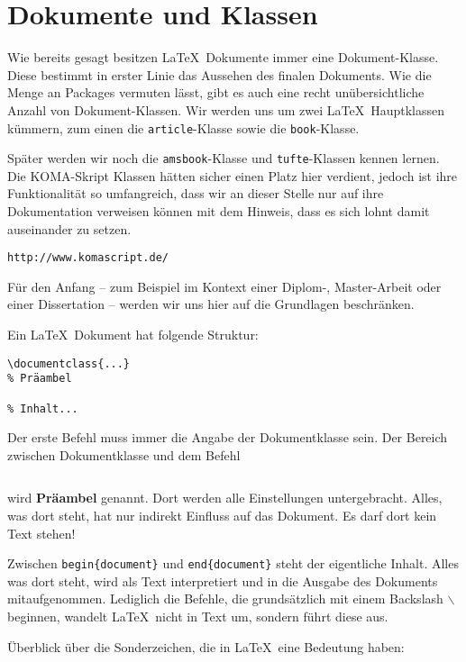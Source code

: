 
\chapter{Dokumente und Klassen}\label{chap:doc}

Wie bereits gesagt besitzen \LaTeX\ Dokumente immer eine Dokument-Klasse. Diese bestimmt in erster Linie das Aussehen des finalen Dokuments. Wie die Menge an Packages vermuten lässt, gibt es auch eine recht unübersichtliche Anzahl von Dokument-Klassen. Wir werden uns um zwei \LaTeX\ Hauptklassen kümmern, zum einen die \texttt{article}-Klasse sowie die \texttt{book}-Klasse.

Später werden wir noch die \texttt{amsbook}-Klasse und \texttt{tufte}-Klassen kennen lernen. Die KOMA-Skript Klassen hätten sicher einen Platz hier verdient, jedoch ist ihre Funktionalität so umfangreich, dass wir an dieser Stelle nur auf ihre Dokumentation verweisen können mit dem Hinweis, dass es sich lohnt damit auseinander zu setzen.
\begin{verbatim}
http://www.komascript.de/
\end{verbatim}
Für den Anfang -- zum Beispiel im Kontext einer Diplom-, Master-Arbeit oder einer Dissertation -- werden wir uns hier auf die Grundlagen beschränken.

Ein \LaTeX\ Dokument hat folgende Struktur: 
\begin{verbatim}
\documentclass{...}
% Präambel

% Inhalt...

\end{verbatim}
Der erste Befehl muss immer die Angabe der Dokumentklasse sein. Der Bereich zwischen Dokumentklasse und dem Befehl
\begin{verbatim}

\end{verbatim}
wird \textbf{Präambel} genannt. Dort werden alle Einstellungen untergebracht. Alles, was dort steht, hat nur indirekt Einfluss auf das Dokument. Es darf dort kein Text stehen! 

Zwischen \texttt{begin\{document\}} und \texttt{end\{document\}} steht der eigentliche Inhalt. Alles was dort steht, wird als Text interpretiert und in die Ausgabe des Dokuments mitaufgenommen. Lediglich die Befehle, die grundsätzlich mit einem Backslash $\backslash$ beginnen, wandelt \LaTeX\ nicht in Text um, sondern führt diese aus.

Überblick über die Sonderzeichen, die in \LaTeX\ eine Bedeutung haben:


